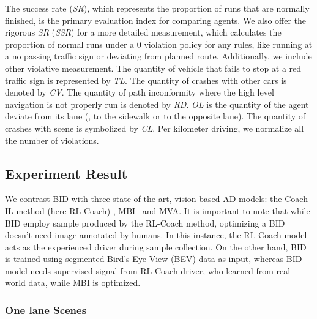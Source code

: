 The success rate (\emph{SR}), which represents the proportion of runs that are normally finished, is the primary evaluation index for comparing agents.
We also offer the rigorous \emph{SR} (\emph{SSR}) for a more detailed measurement, which calculates the proportion of normal runs under a 0 violation policy for any rules, like running at a no passing traffic sign or deviating from planned route.
Additionally, we include other violative measurement.
The quantity of vehicle that fails to stop at a red traffic sign is represented by \emph{TL}.
The quantity of crashes with other cars is denoted by \emph{CV}.
The quantity of path inconformity where the high level navigation is not properly run is denoted by \emph{RD}.
\emph{OL} is the quantity of the agent deviate from its lane ({\eg}, to the sidewalk or to the opposite lane).
The quantity of crashes with scene is symbolized by \emph{CL}.
Per kilometer driving, we normalize all the number of violations.




\subsection{Experiment Result}
\label{sec:Results}
\hspace{1pc}We contrast BID with three state-of-the-art, vision-based AD models: the Coach IL method (here RL-Coach) \cite{Zhang:2021}, MBI~\cite{Hu:2022} and MVA\cite{xiao2023scaling}. 
It is important to note that while BID employ sample produced by the RL-Coach method, optimizing a BID doesn't need image annotated by humans. 
In this instance, the RL-Coach model acts as the experienced driver during sample collection.
On the other hand, BID is trained using segmented Bird's Eye View (BEV) data as input, whereas BID model needs supervised signal from RL-Coach driver, who learned from real world data, while MBI is optimized.


\subsubsection{One lane Scenes} \label{sec:small_town_results}

